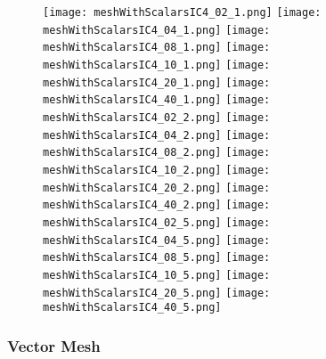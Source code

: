 \documentclass{InsightArticle}
\begin{document}
\begin{figure}
\center
\texttt{[image: meshWithScalarsIC4\_02\_1.png]}
\texttt{[image: meshWithScalarsIC4\_04\_1.png]}
\texttt{[image: meshWithScalarsIC4\_08\_1.png]}
\texttt{[image: meshWithScalarsIC4\_10\_1.png]}
\texttt{[image: meshWithScalarsIC4\_20\_1.png]}
\texttt{[image: meshWithScalarsIC4\_40\_1.png]}
\texttt{[image: meshWithScalarsIC4\_02\_2.png]}
\texttt{[image: meshWithScalarsIC4\_04\_2.png]}
\texttt{[image: meshWithScalarsIC4\_08\_2.png]}
\texttt{[image: meshWithScalarsIC4\_10\_2.png]}
\texttt{[image: meshWithScalarsIC4\_20\_2.png]}
\texttt{[image: meshWithScalarsIC4\_40\_2.png]}
\texttt{[image: meshWithScalarsIC4\_02\_5.png]}
\texttt{[image: meshWithScalarsIC4\_04\_5.png]}
\texttt{[image: meshWithScalarsIC4\_08\_5.png]}
\texttt{[image: meshWithScalarsIC4\_10\_5.png]}
\texttt{[image: meshWithScalarsIC4\_20\_5.png]}
\texttt{[image: meshWithScalarsIC4\_40\_5.png]}
\label{fig:ScalarIC4Smoothings}
\end{figure}


\subsubsection{Vector Mesh}

%
%



\end{document}
